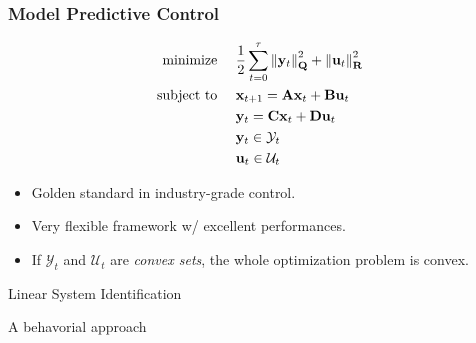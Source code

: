 \documentclass[aspectratio=169,compress,12pt,dvipsnames]{beamer}
\DeclareMathOperator*{\minimize}{minimize~}
\DeclareMathOperator{\subto}{subject~to~}
\begin{document}
\begin{frame}
    \frametitle{Model Predictive Control}
    \vfill
    \begin{minipage}{.48\textwidth}
        \[
        \begin{aligned}
            \minimize & \quad \dfrac12 \sum_{t=0}^{\tau} \norm{\vb{y}_t}^2_{\vb{Q}} + \norm{\vb{u}_t}^2_{\vb{R}} \\
            \subto & \quad \vb{x}_{t+1} = \vb{Ax}_t + \vb{Bu}_t \\
                   & \quad \vb{y}_t = \vb{Cx}_t + \vb{Du}_t \\
                   & \quad \vb{y}_t \in \mathcal{Y}_t \\
                   & \quad \vb{u}_t \in \mathcal{U}_t
        \end{aligned}
        \]
    \end{minipage}%
    \hfill
    \begin{minipage}{.48\textwidth}
        \begin{itemize}
            \item Golden standard in industry-grade control.
            \item Very flexible framework w/ excellent performances.
            \item If $\mathcal{Y}_t$ and $\mathcal{U}_t$ are \emph{convex sets}, the whole optimization problem is convex.
        \end{itemize}
    \end{minipage}
    \vfill
\end{frame}

\begin{frame}
    Linear System Identification

    A behavorial approach
\end{frame}
\end{document}
